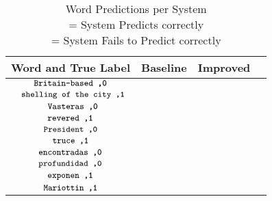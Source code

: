 \documentclass[10pt,a4paper]{article}
\newcommand{\cmark}{\ding{51}}%
\newcommand{\xmark}{\ding{55}}%
\begin{document}
\begin{table}[!htbp]
 \begin{adjustbox}{right=7.5cm}
\begin{tabular}{|c|c|c|c|} \hline
\textbf{Word and True Label} &   \textbf{Baseline}  &  \textbf{Improved } \\ \hline
$ \texttt{\small Britain-based  \textbf{,0}}$  & \xmark &  \cmark \\ \hline
$\texttt{ \small shelling of the city \textbf{,1}}$ & \xmark  &  \cmark \\ \hline
$\texttt{ \small Vasteras \textbf{,0}}$  & \xmark  & \cmark  \\ \hline
$\texttt{\small  revered \textbf{,1}} $ & \xmark  & \cmark \\ \hline
$ \texttt{\small President \textbf{,0}} $  & \xmark & \cmark\\ \hline
$\texttt{\small  truce \textbf{,1}} $ & \xmark &  \cmark \\ \hline
$\texttt{\small encontradas \textbf{,0}}$  &  \xmark & \cmark \\ \hline
$\texttt{\small  profundidad  \textbf{,0}} $ &   \xmark &   \cmark \\ \hline
$\texttt{\small  exponen  \textbf{,1}}$  & \xmark & \cmark \\ \hline
$ \texttt{\small Mariottin \textbf{,1}} $ &\xmark &  \cmark  \\ \hline
\end{tabular}
 \end{adjustbox}
\caption{Word Predictions per System\\ \cmark= System Predicts correctly \\ \xmark= System Fails to Predict correctly}
\label{T:Features left after features with a specific percentage of Missing Values Removed}
\end{table}
\end{document}
